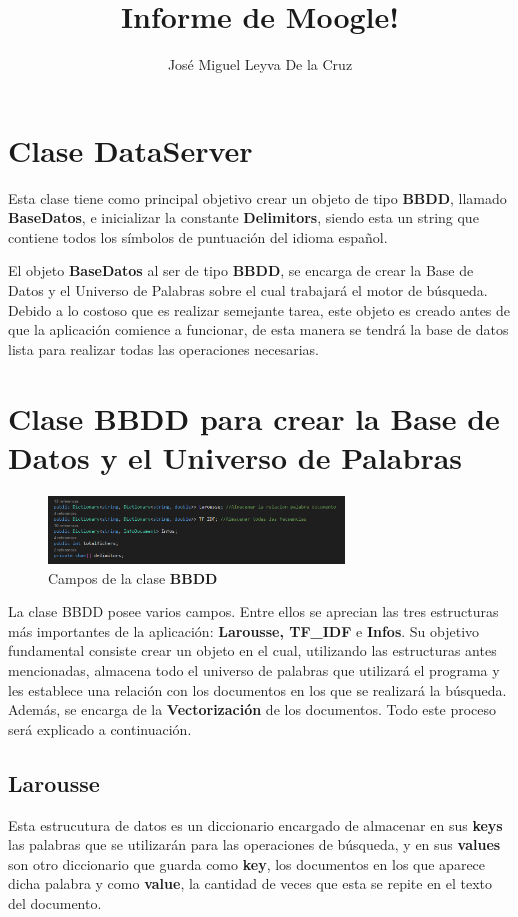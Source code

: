 \documentclass[10pt,a4paper]{article}
\author{José Miguel Leyva De la Cruz}
\title{Informe de Moogle!}
\date{}
\begin{document}
\maketitle

\section{Clase DataServer}
\setlength{\parindent}{1em} Esta clase tiene como principal objetivo crear un objeto de tipo \textbf{BBDD}, llamado \textbf{BaseDatos}, e inicializar la constante \textbf{Delimitors}, siendo esta un string que contiene todos los s\'imbolos de puntuaci\'on del idioma espa\~nol.

\setlength{\parindent}{1em} El objeto \textbf{BaseDatos} al ser de tipo \textbf{BBDD}, se encarga de crear la Base de Datos y el Universo de Palabras sobre el cual trabajar\'a el motor de b\'usqueda. Debido a lo costoso que es realizar semejante tarea, este objeto es creado antes de que la aplicaci\'on comience a funcionar, de esta manera se tendr\'a la base de datos lista para realizar todas las operaciones necesarias.

\section{Clase BBDD para crear la Base de Datos y el Universo de Palabras}
\begin{figure}[!h]
\centering
\includegraphics[width = 0.7\textwidth]{Clase BBDD.png}
\caption{Campos de la clase \textbf{BBDD}}
\end{figure}
\setlength{\parindent}{1em} La clase BBDD posee varios campos. Entre ellos se aprecian las tres estructuras m\'as importantes de la aplicaci\'on: \textbf{Larousse, TF\_IDF} e \textbf{Infos}. Su objetivo fundamental consiste crear un objeto en el cual, utilizando las estructuras antes mencionadas, almacena todo el universo de palabras que utilizar\'a el programa y les establece una relaci\'on con los documentos en los que se realizar\'a la b\'usqueda. Adem\'as, se encarga de la \textbf{Vectorizaci\'on} de los documentos. Todo este proceso ser\'a explicado a continuaci\'on.

\subsection{Larousse}
\setlength{\parindent}{1em} Esta estrucutura de datos es un diccionario encargado de almacenar en sus \textbf{keys} las palabras que se utilizar\'an para las operaciones de b\'usqueda, y en sus \textbf{values} son otro diccionario que guarda como \textbf{key}, los documentos en los que aparece dicha palabra y como \textbf{value}, la cantidad de veces que esta se repite en el texto del documento.
\end{document}
